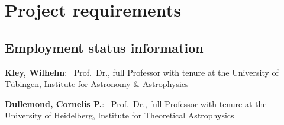 \documentclass[10pt,fleqn,twoside]{article}
\begin{document}
% 
% 
% 
% 
% 
% 
% 
% 
% 
% 
% 
% 

\section{Project requirements}
\renewcommand{\leftmark}{\sc Project requirements}

\subsection{Employment status information}

{\bf Kley, Wilhelm}: \, Prof.\ Dr., full Professor with tenure at the University of T\"ubingen,
Institute for Astronomy \& Astrophysics

{\bf Dullemond, Cornelis P.}: \, Prof.\ Dr., full Professor with tenure at the University of Heidelberg,
Institute for Theoretical Astrophysics
\end{document}
